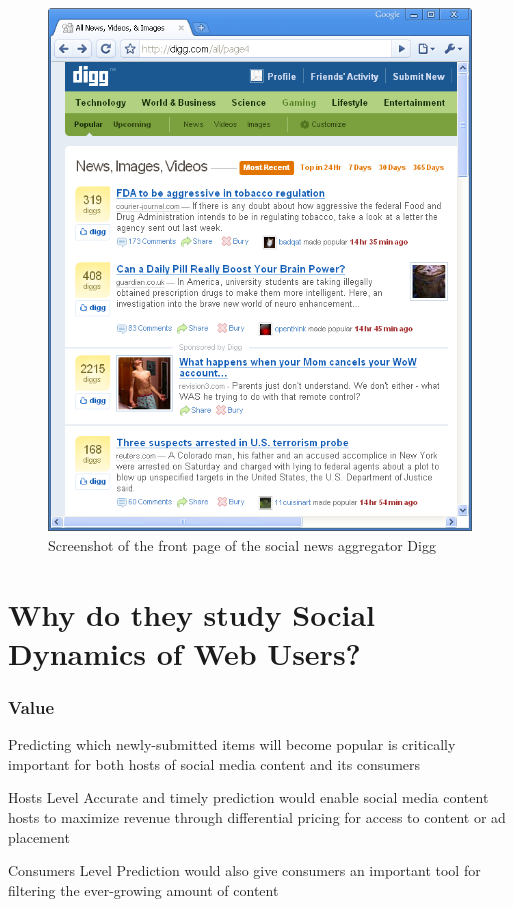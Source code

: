 \documentclass[aspectratio=43]{beamer}
\begin{document}
\begin{frame}
\begin{minipage}{\textwidth}
\begin{figure}
\centering
\includegraphics[height=0.8\textheight]{fig01.png}
\caption{Screenshot of the front page of the social news aggregator Digg}
\end{figure}
\end{minipage}
\end{frame}

\section[Value]{Why do they study Social Dynamics of Web Users?}
\begin{frame}
\frametitle{Value}
\centering
\begin{minipage}{\textwidth}
\begin{alertblock}{}
Predicting which newly-submitted items will become popular is critically important for both hosts of social media content and its consumers
\end{alertblock}
\begin{exampleblock}{Hosts Level}
Accurate and timely prediction would enable social media content hosts to maximize revenue through differential pricing for access to content or ad placement
\end{exampleblock}
\begin{block}{Consumers Level}
Prediction would also give consumers an important tool for filtering the ever-growing amount of content
\end{block}
\end{minipage}
\end{frame}
\end{document}
